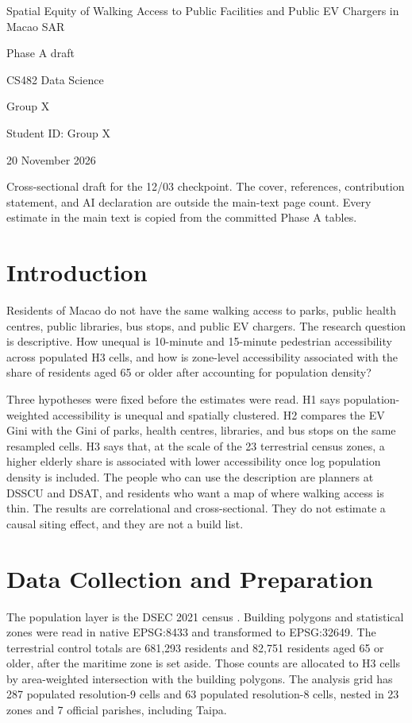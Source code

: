 \documentclass[11pt,a4paper]{article}
\begin{document}
\begin{titlepage}
\centering
\vspace*{24mm}
{\Large Spatial Equity of Walking Access to Public Facilities and Public EV Chargers in Macao SAR\par}
\vspace{1em}
{\large Phase A draft\par}
\vspace{1em}
CS482 Data Science\par
Group X\par
Student ID: Group X\par
\vspace{1em}
20 November 2026\par
\vspace{2em}
\begin{minipage}{\textwidth}
\raggedright
Cross-sectional draft for the 12/03 checkpoint. The cover, references, contribution statement, and AI declaration are outside the main-text page count. Every estimate in the main text is copied from the committed Phase A tables.
\end{minipage}
\end{titlepage}

\section{Introduction}
Residents of Macao do not have the same walking access to parks, public health centres, public libraries, bus stops, and public EV chargers. The research question is descriptive. How unequal is 10-minute and 15-minute pedestrian accessibility across populated H3 cells, and how is zone-level accessibility associated with the share of residents aged 65 or older after accounting for population density?

Three hypotheses were fixed before the estimates were read. H1 says population-weighted accessibility is unequal and spatially clustered. H2 compares the EV Gini with the Gini of parks, health centres, libraries, and bus stops on the same resampled cells. H3 says that, at the scale of the 23 terrestrial census zones, a higher elderly share is associated with lower accessibility once log population density is included. The people who can use the description are planners at DSSCU and DSAT, and residents who want a map of where walking access is thin. The results are correlational and cross-sectional. They do not estimate a causal siting effect, and they are not a build list.

\section{Data Collection and Preparation}
The population layer is the DSEC 2021 census \citep{dsec2021}. Building polygons and statistical zones were read in native EPSG:8433 and transformed to EPSG:32649. The terrestrial control totals are 681,293 residents and 82,751 residents aged 65 or older, after the maritime zone is set aside. Those counts are allocated to H3 cells by area-weighted intersection with the building polygons. The analysis grid has 287 populated resolution-9 cells and 63 populated resolution-8 cells, nested in 23 zones and 7 official parishes, including Taipa.
\end{document}
